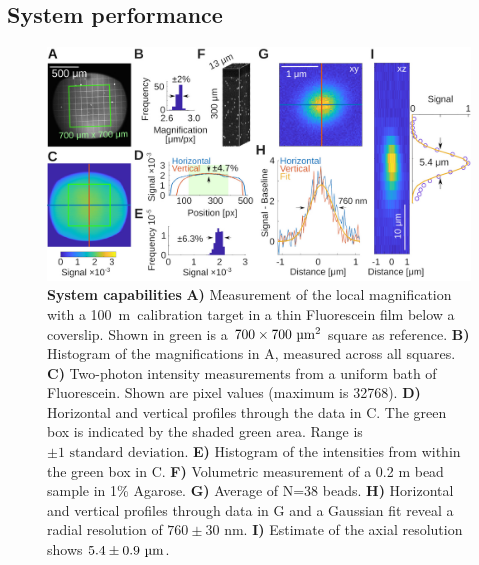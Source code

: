 \documentclass[10pt,letterpaper]{article}
\newcommand{\microns}{~\textmu m~} %
\begin{document}
\subsection*{System performance}
%
%
\begin{figure}[t]
    \includegraphics[width=\textwidth]{fig5.jpg}
    \caption{{\bf System capabilities} \textbf{A)} Measurement of the local magnification with a 100\microns calibration target in a thin Fluorescein film below a coverslip. Shown in green is a $700\times700\text{ \textmu m}^2$ square as reference. \textbf{B)} Histogram of the magnifications in A, measured across all squares. \textbf{C)} Two-photon intensity measurements from a uniform bath of Fluorescein. Shown are pixel values (maximum is 32768). \textbf{D)} Horizontal and vertical profiles through the data in C. The green box is indicated by the shaded green area. Range is $\pm 1 \text{ standard deviation}$. \textbf{E)} Histogram of the intensities from within the green box in C. \textbf{F)} Volumetric measurement of a 0.2 \textmu m bead sample in 1\% Agarose. \textbf{G)} Average of N=38 beads. \textbf{H)} Horizontal and vertical profiles through data in G and a Gaussian fit reveal a radial resolution of $760\pm30\text{ nm}$. \textbf{I)} Estimate of the axial resolution shows $5.4\pm0.9\text{ \textmu m}$.}
    \label{fig5}
\end{figure}
%
\end{document}
